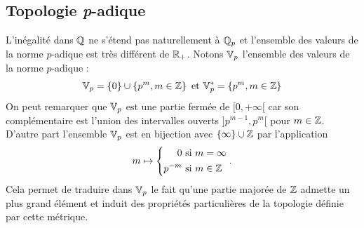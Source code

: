 \subsection{Topologie \emph{p}-adique}\label{SubSec:TopoPadic}
\noindent L'inégalité dans $\mathbb{Q}$ ne s'étend pas naturellement à $\mathbb{Q}_p$ et l'ensemble des valeurs de la norme $p$-adique est très différent de $\mathbb{R}_+$. Notons $\mathbb{V}_p$ l'ensemble des valeurs de la norme $p$-adique :
\begin{displaymath}
 \mathbb{V}_p = \{0\} \cup \left\lbrace p^m, m \in \mathbb{Z} \right\rbrace \text{ et } \mathbb{V}_p^{*} = \left\lbrace p^m, m \in \mathbb{Z} \right\rbrace
\end{displaymath}
\noindent On peut remarquer que $\mathbb{V}_p$ est une partie fermée de $[0, +\infty[$ car son complémentaire est l'union des intervalles ouverts $]p^{m-1}, p^m[$ pour $m\in \mathbb{Z}$.
 D'autre part l'ensemble $\mathbb{V}_p$ est en bijection avec $\{\infty\}\cup \mathbb{Z}$ par l'application
 \begin{displaymath}
  m \mapsto
  \left\lbrace
  \begin{aligned}
   0 &\text{ si } m = \infty \\
   p^{-m} &\text{ si } m \in \mathbb{Z}
  \end{aligned}
  \right. .
 \end{displaymath}
Cela permet de traduire dans $\mathbb{V}_p$ le fait qu'une partie majorée de $\mathbb{Z}$ admette un plus grand élément et induit des propriétés particulières de la topologie définie par cette métrique.

